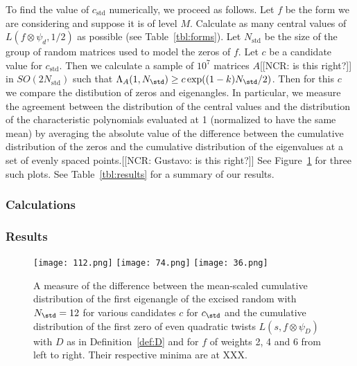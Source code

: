 \documentclass[11pt]{amsart}
\newcommand{\ncr}[1]{{\color{blue}\textsf{[[NCR: #1]]}}}
\begin{document}
To find the value of $c_\text{std}$ numerically, we proceed as follows.  Let $f$ be the form we are considering and suppose it is of level $M$.  Calculate as many central values of $L(f\otimes \psi_d, 1/2)$ as possible (see Table~\ref{tbl:forms}).  Let $N_\text{std}$ be the size of the group of random matrices used to model the zeros of $f$.  Let $c$ be a candidate value for $c_\text{std}$.  Then we calculate a sample of $10^{7}$ matrices $A$\ncr{is this right?} in $SO(2N_\text{std})$ such that $\Lambda_A(1,N_\std) \geq c \exp((1-k)N_\std/2)$.  Then for this $c$ we compare the distibution of zeros and eigenangles.  In particular, we measure the agreement between the distribution of the central values and the distribution of the characteristic polynomials evaluated at 1 (normalized to have the same mean) by averaging the absolute value of the difference between the cumulative distribution of the zeros and the cumulative distribution of the eigenvalues at a set of evenly spaced points.\ncr{Gustavo:  is this right?}  See Figure~\ref{fig:numerical-c} for three such plots.  See Table~\ref{tbl:results} for a summary of our results.


\subsubsection{Calculations}



\subsubsection{Results}

\begin{figure}
\centering
\texttt{[image: 112.png]} \hfill \texttt{[image: 74.png]} \hfill \texttt{[image: 36.png]}
\caption{A measure of the difference between the mean-scaled cumulative distribution of the first eigenangle of the excised random with $N_\std = 12$ for various candidates $c$ for $c_\std$ and the cumulative distribution of the first zero of even quadratic twists $L(s,f\otimes \psi_D)$ with $D$ as in Definition~\ref{def:D} and for $f$ of weights 2, 4 and 6 from left to right.  Their respective minima are at XXX.}\label{fig:numerical-c}
\end{figure}
\end{document}
